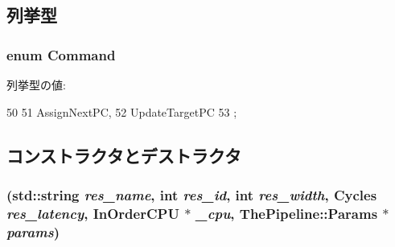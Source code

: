 \subsection{列挙型}
\hypertarget{classFetchSeqUnit_a2afce0a47a93eee73a314d53e4890153}{
\subsubsection[{Command}]{\setlength{\rightskip}{0pt plus 5cm}enum {\bf Command}}}
\label{classFetchSeqUnit_a2afce0a47a93eee73a314d53e4890153}
\begin{Desc}
\item[列挙型の値: ]\par
\begin{description}
\item[{\em 
\hypertarget{classFetchSeqUnit_a2afce0a47a93eee73a314d53e4890153a01d26f167ac9e921c263bbcd80dd3bc4}{
AssignNextPC}
\label{classFetchSeqUnit_a2afce0a47a93eee73a314d53e4890153a01d26f167ac9e921c263bbcd80dd3bc4}
}]\item[{\em 
\hypertarget{classFetchSeqUnit_a2afce0a47a93eee73a314d53e4890153abf7b003b9980c66157a424a6142f1c38}{
UpdateTargetPC}
\label{classFetchSeqUnit_a2afce0a47a93eee73a314d53e4890153abf7b003b9980c66157a424a6142f1c38}
}]\end{description}
\end{Desc}




\begin{DoxyCode}
50                  {
51         AssignNextPC,
52         UpdateTargetPC
53     };
\end{DoxyCode}


\subsection{コンストラクタとデストラクタ}
\hypertarget{classFetchSeqUnit_ae6f057ce72f6f86ce462fbca75d64a67}{
\subsubsection[{FetchSeqUnit}]{ (std::string {\em res\_\-name}, \/  int {\em res\_\-id}, \/  int {\em res\_\-width}, \/  {\bf Cycles} {\em res\_\-latency}, \/  {\bf InOrderCPU} $\ast$ {\em \_\-cpu}, \/  {\bf ThePipeline::Params} $\ast$ {\em params})}}
\label{classFetchSeqUnit_ae6f057ce72f6f86ce462fbca75d64a67}




